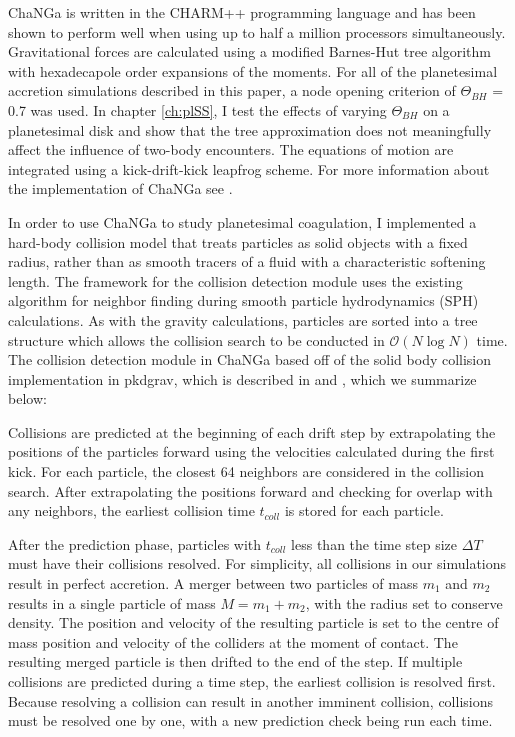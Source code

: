 {\sc ChaNGa} is written in the {\sc CHARM++} programming language and has been shown to perform well when using up to half a million processors \cite{menon15} simultaneously. Gravitational forces are calculated using a modified Barnes-Hut tree algorithm with hexadecapole order expansions of the moments. For all of the planetesimal accretion simulations described in this paper, a node opening criterion of $\Theta_{BH}$ = 0.7 was used. In chapter \ref{ch:plSS}, I test the effects of varying $\Theta_{BH}$ on a planetesimal disk and show that the tree approximation does not meaningfully affect the influence of two-body encounters. The equations of motion are integrated using a kick-drift-kick leapfrog scheme. For more information about the implementation of {\sc ChaNGa} see \cite{jetley08}.


In order to use {\sc ChaNGa} to study planetesimal coagulation, I implemented a hard-body collision model that treats particles as solid objects with a fixed radius, rather than as smooth tracers of a fluid with a characteristic softening length. The framework for the collision detection module uses the existing algorithm for neighbor finding during smooth particle hydrodynamics (SPH) calculations. As with the gravity calculations, particles are sorted into a tree structure which allows the collision search to be conducted in $\mathcal{O}(N\log{}N)$ time. The collision detection module in {\sc ChaNGa} based off of the solid body collision implementation in {\sc pkdgrav}, which is described in \cite{richardson94} and \cite{richardson00}, which we summarize below:

Collisions are predicted at the beginning of each drift step by extrapolating the positions of the particles forward using the velocities calculated during the first kick. For each particle, the closest 64 neighbors are considered in the collision search. After extrapolating the positions forward and checking for overlap with any neighbors, the earliest collision time $t_{coll}$ is stored for each particle.

After the prediction phase, particles with $t_{coll}$ less than the time step size $\Delta T$ must have their collisions resolved. For simplicity, all collisions in our simulations result in perfect accretion. A merger between two particles of mass $m_{1}$ and $m_{2}$ results in a single particle of mass $M = m_{1} + m_{2}$, with the radius set to conserve density. The position and velocity of the resulting particle is set to the centre of mass position and velocity of the colliders at the moment of contact. The resulting merged particle is then drifted to the end of the step. If multiple collisions are predicted during a time step, the earliest collision is resolved first. Because resolving a collision can result in another imminent collision, collisions must be resolved one by one, with a new prediction check being run each time.

